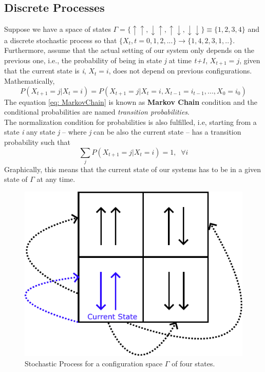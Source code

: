 \subsection{Discrete Processes}
Suppose we have a space of states $\Gamma = \{\uparrow \uparrow,\downarrow \uparrow,\uparrow \downarrow,\downarrow \downarrow \} \equiv \{1, 2, 3, 4 \}$ and a discrete stochastic process so that $\{X_{t}, t= 0,1,2,...\} \rightarrow \{1,4,2,3,1,..\}$. Furthermore, assume that the actual setting of our system only depends on the previous one, i.e., the probability of being in state \textit{j} at time \textit{t+1}, $X_{t+1}= j$, given that the current state is \textit{i}, $X_{t} = i$, does not depend on previous configurations. Mathematically,
\begin{equation}
\label{eq: MarkovChain}
    P\left(X_{t+1} = j | X_{t} = i\right) = P\left(X_{t+1}=j | X_{t} = i, X_{t-1} =i_{t-1},...,X_{0} = i_{0}\right)
\end{equation}
The equation \ref{eq: MarkovChain} is known as \textbf{Markov Chain} condition and the conditional probabilities are named \textit{transition probabilities}.\\
The normalization condition for probabilities is also fulfilled, i.e, starting from a state  \textit{i} any state \textit{j} -- where \textit{j} can be also the current state -- has a transition probability such that
\begin{equation}
    \sum_{j}P\left(X_{t+1} = j | X_{t} = i\right) = 1, \;\; \forall i
\end{equation}
Graphically, this means that the current state of our systems has to be in a given state of $\Gamma$ at any time.
\begin{figure}[H]
    \centering
    \includegraphics[scale=0.65]{Figures/SA_StateJump.pdf}
    \caption{Stochastic Process for a configuration space $\Gamma$ of four states.}
    \label{fig:SimulatedAnneling_StatesJump}
\end{figure}
